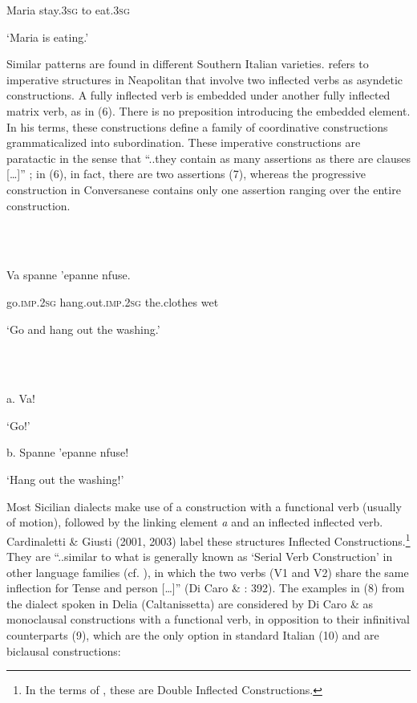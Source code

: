 \documentclass[output=paper]{langsci/langscibook}
\begin{document}
Maria  stay.\textsc{3sg}  to  eat.\textsc{3sg}

‘Maria is eating.’

Similar patterns are found in different Southern Italian varieties. \citet{Ledgeway1997} refers to imperative structures in Neapolitan that involve two inflected verbs as asyndetic constructions. A fully inflected verb is embedded under another fully inflected matrix verb, as in (6). There is no preposition introducing the embedded element. In his terms, these constructions define a family of coordinative constructions grammaticalized into subordination. These imperative constructions are paratactic in the sense that “..they contain as many assertions as there are clauses […]” \citep[231]{Ledgeway1997}; in (6), in fact, there are two assertions (7), whereas the progressive construction in Conversanese contains only one assertion ranging over the entire construction.

\ea%
    \label{ex:key:6}
    \gll\\
        \\
    \glt
    \z

          Va     spanne     'epanne  nfuse.

go.\textsc{imp.2sg} hang.out.\textsc{imp.2sg}  the.clothes  wet

‘Go and hang out the washing.’ \citep[230]{Ledgeway1997}

\ea%
    \label{ex:key:7}
    \gll\\
        \\
    \glt
    \z

          a.  Va!

‘Go!’

b.  Spanne 'epanne nfuse!

‘Hang out the washing!’ \citep[231]{Ledgeway1997}

Most Sicilian dialects make use of a construction with a functional verb (usually of motion), followed by the linking element \textit{a} and an inflected inflected verb. Cardinaletti \& Giusti (2001, 2003) label these structures Inflected Constructions.\footnote{In the terms of \citet{Cruschina2013}, these are Double Inflected Constructions.} They are “..similar to what is generally known as ‘Serial Verb Construction’ in other language families (cf. \citealt{Aikhenvald2006}), in which the two verbs (V1 and V2) share the same inflection for Tense and person […]” (Di Caro \& \citealt{Giusti2015}: 392). The examples in (8) from the dialect spoken in Delia (Caltanissetta) are considered by Di Caro \& \citet{Giusti2015} as monoclausal constructions with a functional verb, in opposition to their infinitival counterparts (9), which are the only option in standard Italian (10) and are biclausal constructions:
\end{document}
